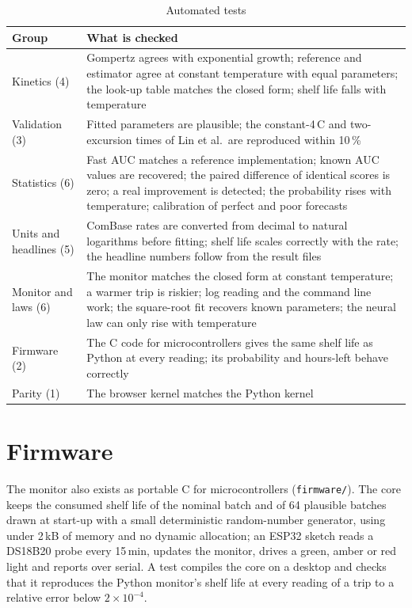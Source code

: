 \documentclass[11pt,a4paper,twoside,openany]{book}
\newcommand{\degC}{\,\textdegree C}
\theoremstyle{plain}\newtheorem{proposition}{Proposition}\newtheorem{corollary}{Corollary}
\theoremstyle{definition}\newtheorem{definition}{Definition}[chapter]
\begin{document}
\begin{table}[!htbp]\centering\footnotesize
\caption{Automated tests}\label{tab:tests}
\begin{tabular}{@{}p{2.8cm}p{11cm}@{}}\toprule\rowcolor{dghead}
Group & What is checked\\\midrule
Kinetics (4) & Gompertz agrees with exponential growth; reference and estimator agree at constant temperature with equal parameters; the look-up table matches the closed form; shelf life falls with temperature\\
Validation (3) & Fitted parameters are plausible; the constant-4\degC{} and two-excursion times of Lin et al.\ are reproduced within 10\,\%\\
Statistics (6) & Fast AUC matches a reference implementation; known AUC values are recovered; the paired difference of identical scores is zero; a real improvement is detected; the probability rises with temperature; calibration of perfect and poor forecasts\\
Units and headlines (5) & ComBase rates are converted from decimal to natural logarithms before fitting; shelf life scales correctly with the rate; the headline numbers follow from the result files\\
Monitor and laws (6) & The monitor matches the closed form at constant temperature; a warmer trip is riskier; log reading and the command line work; the square-root fit recovers known parameters; the neural law can only rise with temperature\\
Firmware (2) & The C code for microcontrollers gives the same shelf life as Python at every reading; its probability and hours-left behave correctly\\
Parity (1) & The browser kernel matches the Python kernel\\
\bottomrule\end{tabular}\end{table}

\section{Firmware}
The monitor also exists as portable C for microcontrollers (\texttt{firmware/}). The core keeps the consumed shelf life of the nominal batch and of 64 plausible batches drawn at start-up with a small deterministic random-number generator, using under 2\,kB of memory and no dynamic allocation; an ESP32 sketch reads a DS18B20 probe every 15\,min, updates the monitor, drives a green, amber or red light and reports over serial. A test compiles the core on a desktop and checks that it reproduces the Python monitor's shelf life at every reading of a trip to a relative error below $2\times10^{-4}$.
\end{document}
